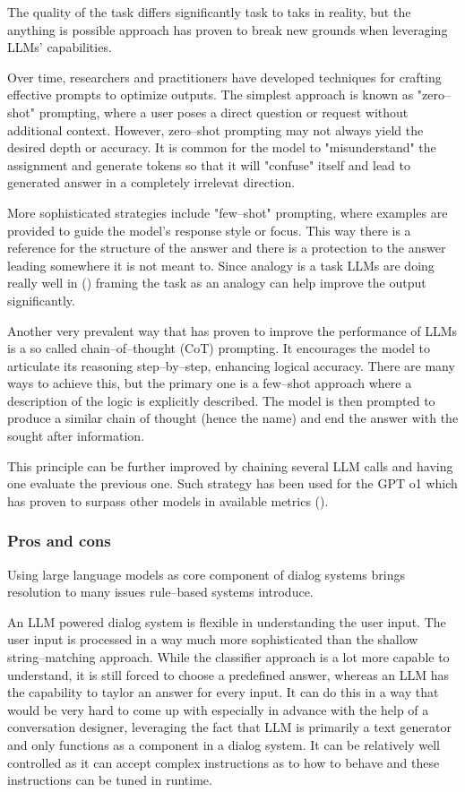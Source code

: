 \documentclass[12pt]{report}
\begin{document}
{The quality of the task differs significantly task to taks in reality,
but the anything is possible approach has proven to break new grounds
when leveraging LLMs' capabilities.

Over time, researchers and practitioners have developed techniques for
crafting effective prompts to optimize outputs.
The simplest approach is known as "zero–shot" prompting,
where a user poses a direct question or request without additional context.
However, zero–shot prompting may not always yield the desired depth or accuracy.
It is common for the model to "misunderstand" the assignment
and generate tokens so that it will "confuse" itself
and lead to generated answer in a completely irrelevat direction.

More sophisticated strategies include "few–shot" prompting,
where examples are provided to guide the model's response style or focus.
This way there is a reference for the structure of the answer
and there is a protection to the answer leading somewhere it is not meant to.
Since analogy is a task LLMs are doing really well in ()
framing the task as an analogy can help improve the output significantly.

Another very prevalent way that has proven to
improve the performance of LLMs is a so called
chain–of–thought (CoT) prompting.
It encourages the model to
articulate its reasoning step–by–step,
enhancing logical accuracy.
There are many ways to achieve this,
but the primary one is a few–shot approach
where a description of the logic is
explicitly described.
The model is then prompted to produce
a similar chain of thought (hence the name)
and end the answer with the sought after information.

This principle can be further improved by
chaining several LLM calls and having one
evaluate the previous one.
Such strategy has been used for the GPT o1
which has proven to surpass other models
in available metrics ().

\subsubsection{Pros and cons}

Using large language models as core component
of dialog systems brings resolution to many issues
rule–based systems introduce.

An LLM powered dialog system is flexible in understanding
the user input.
The user input is processed in a way much more sophisticated
than the shallow string–matching approach.
While the classifier approach is a lot more capable to understand,
it is still forced to choose a predefined answer, whereas
an LLM has the capability to taylor an answer for every input.
It can do this in a way that would be very hard to come up with
especially in advance with the help of a conversation designer,
leveraging the fact that LLM is primarily a text generator
and only functions as a component in a dialog system.
It can be relatively well controlled as
it can accept complex instructions as to how to behave
and these instructions can be tuned in runtime.

}
\end{document}
